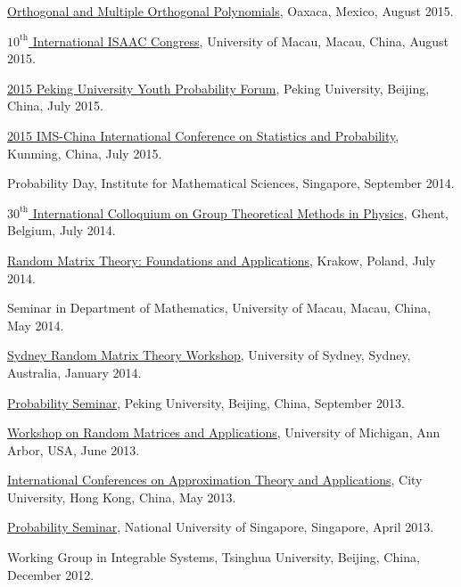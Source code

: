 \begin{item_list}
\item
  \href{http://www.birs.ca/events/2015/5-day-workshops/15w5022}{Orthogonal and Multiple Orthogonal Polynomials}, Oaxaca, Mexico, August 2015.
\item
  \href{http://www.fst.umac.mo/conference/isaac2015/}{$10^{\text{th}}$ International ISAAC Congress}, University of Macau, Macau, China, August 2015.
\item
  \href{http://www.math.pku.edu.cn/teachers/liuyong/2015forum/admin/html/default.php}{2015 Peking University Youth Probability Forum}, Peking University, Beijing, China, July 2015.
\item
  \href{http://www.2015imschina.com/}{2015 IMS-China International Conference on Statistics and Probability}, Kunming, China, July 2015.
\item
  Probability Day, Institute for Mathematical Sciences, Singapore, September 2014.
\item \href{http://th-www.if.uj.edu.pl/~matrix2014/index.html}{$30^{\text{th}}$ International Colloquium on Group Theoretical Methods in Physics}, Ghent, Belgium, July 2014.
\item
  \href{http://th-www.if.uj.edu.pl/~matrix2014/index.html}{Random Matrix Theory: Foundations and Applications}, Krakow, Poland, July 2014.
\item
  Seminar in Department of Mathematics, University of Macau, Macau, China, May 2014.
\item
  \href{http://www.maths.usyd.edu.au/u/olver/conferences/RMT.html}{Sydney Random Matrix Theory Workshop}, University of Sydney, Sydney, Australia, January 2014. 
\item
  \href{http://www.math.pku.edu.cn/teachers/liuyong/seminarC.htm}{Probability Seminar}, Peking University, Beijing, China, September 2013.
\item
  \href{http://web.eecs.umich.edu/~rajnrao/rmt2013/}{Workshop on Random Matrices and Applications}, University of Michigan, Ann Arbor, USA, June 2013.
\item
  \href{http://www6.cityu.edu.hk/ma/maicata/}{International Conferences on Approximation Theory and Applications}, City University, Hong Kong, China, May 2013.
\item
  \href{http://www.math.nus.edu.sg/seminars.aspx?CatID=9}{Probability Seminar}, National University of Singapore, Singapore, April 2013.
\item
  Working Group in Integrable Systems, Tsinghua University, Beijing, China, December 2012.
\item

\end{item_list}
